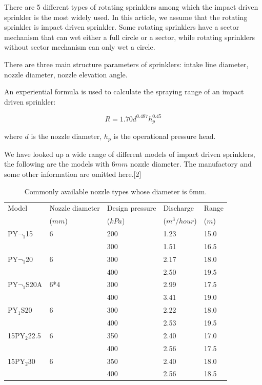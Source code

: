 \documentclass[12pt,a4paper,titlepage]{article}
\begin{document}
There are 5 different types of rotating sprinklers among which the
impact driven sprinkler is the most widely used. In this article,
we assume that the rotating sprinkler is impact driven sprinkler.
Some rotating sprinklers have a sector mechanism that can wet
either a full circle or a sector, while rotating sprinklers
without sector mechanism can only wet a circle.

There are three main structure parameters of sprinklers: intake
line diameter, nozzle diameter, nozzle elevation angle.

An experiential formula is used to calculate the spraying range of
an impact driven sprinkler:

\[
R=1.70d^{0.487}h_p^{0.45}
\]

where $d$ is the nozzle diameter, $h_p$ is the operational
pressure head.

We have looked up a wide range of different models of impact
driven sprinklers, the following are the models with $6mm$ nozzle
diameter. The manufactory and some other information are omitted
here.[2]

\newpage


\begin{table}[!htb]
\centering \caption{Commonly available nozzle types whose diameter
is 6mm.}
\begin{tabular}{lllll}
\hline
Model & Nozzle diameter & Design pressure & Discharge & Range \\
 & ($mm$) & ($kPa$) & ($m^3/hour$) & ($m$) \\
\hline
PY$\neg_{1}$15 & 6 & 200 & 1.23 & 15.0 \\
 &  & 300 & 1.51 & 16.5 \\
\hline
PY$\neg_{1}$20 & 6 & 300 & 2.17 & 18.0 \\
 &  & 400 & 2.50 & 19.5 \\
\hline
PY$\neg_{1}$S20A & 6*4 & 300 & 2.99 & 17.5 \\
 &  & 400 & 3.41 & 19.0 \\
\hline
PY$_1$S20 & 6 & 300 & 2.22 & 18.0 \\
 &  & 400 & 2.53 & 19.5 \\
\hline
15PY$_2$22.5 & 6 & 350 & 2.40 & 17.0 \\
 &  & 400 & 2.56 & 17.5 \\
\hline
15PY$_2$30 & 6 & 350 & 2.40 & 18.0 \\
 &  & 400 & 2.56 & 18.5 \\
\hline
\end{tabular}

\end{table}
\end{document}
